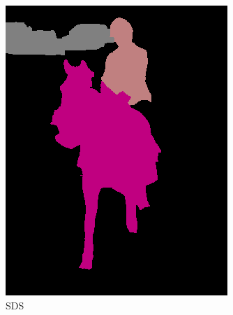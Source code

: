 \begin{figure}[t]
\begin{subfigure}[b]{0.244\textwidth}
    \includegraphics[width=\textwidth]{gfx/app-segmentation-3}
    \caption{SDS \cite{Hariharan2014}}
  \end{subfigure}
  \begin{subfigure}[b]{0.244\textwidth}

\end{subfigure}
\end{figure}
